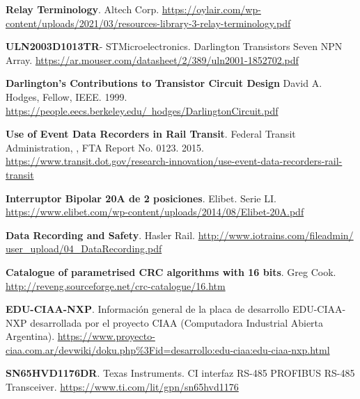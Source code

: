 \begin{thebibliography}{30}
\textbf{Relay Terminology}. Altech Corp.
\href{https://oylair.com/wp-content/uploads/2021/03/resources-library-3-relay-terminology.pdf}{https://oylair.com/wp-content/uploads/2021/03/resources-library-3-relay-terminology.pdf}


\textbf{ULN2003D1013TR}- STMicroelectronics. Darlington Transistors Seven NPN Array.
\href{https://ar.mouser.com/datasheet/2/389/uln2001-1852702.pdf}{https://ar.mouser.com/datasheet/2/389/uln2001-1852702.pdf}

\textbf{Darlington’s Contributions to Transistor Circuit Design} David A. Hodges, Fellow, IEEE. 1999.
\href{https://people.eecs.berkeley.edu/~hodges/DarlingtonCircuit.pdf}{https://people.eecs.berkeley.edu/~hodges/DarlingtonCircuit.pdf}


\textbf{Use of Event Data Recorders in Rail Transit}. Federal Transit Administration, , FTA Report No. 0123. 2015.
\href{https://www.transit.dot.gov/research-innovation/use-event-data-recorders-rail-transit}{https://www.transit.dot.gov/research-innovation/use-event-data-recorders-rail-transit}

\textbf{Interruptor Bipolar 20A de 2 posiciones}. Elibet. Serie LI. 
\href{https://www.elibet.com/wp-content/uploads/2014/08/Elibet-20A.pdf}{https://www.elibet.com/wp-content/uploads/2014/08/Elibet-20A.pdf}

\textbf{Data Recording and Safety}. Hasler Rail. \href{http://www.iotrains.com/fileadmin/user_upload/04_DataRecording.pdf}{http://www.iotrains.com/fileadmin/ user\_upload/04\_DataRecording.pdf}

\textbf{Catalogue of parametrised CRC algorithms with 16 bits}. Greg Cook. 
\href{http://reveng.sourceforge.net/crc-catalogue/16.htm}{http://reveng.sourceforge.net/crc-catalogue/16.htm}


\textbf{EDU-CIAA-NXP}. Información general de la placa de desarrollo EDU-CIAA-NXP desarrollada por el proyecto CIAA (Computadora Industrial Abierta Argentina). \href{https://www.proyecto-ciaa.com.ar/devwiki/doku.php%3Fid=desarrollo:edu-ciaa:edu-ciaa-nxp.html}{https://www.proyecto-ciaa.com.ar/devwiki/doku.php\%3Fid=desarrollo:edu-ciaa:edu-ciaa-nxp.html}

\textbf{SN65HVD1176DR}. Texas Instruments. CI interfaz RS-485 PROFIBUS RS-485 Transceiver. 
\href{https://www.ti.com/lit/gpn/sn65hvd1176}{https://www.ti.com/lit/gpn/sn65hvd1176}


\end{thebibliography}
